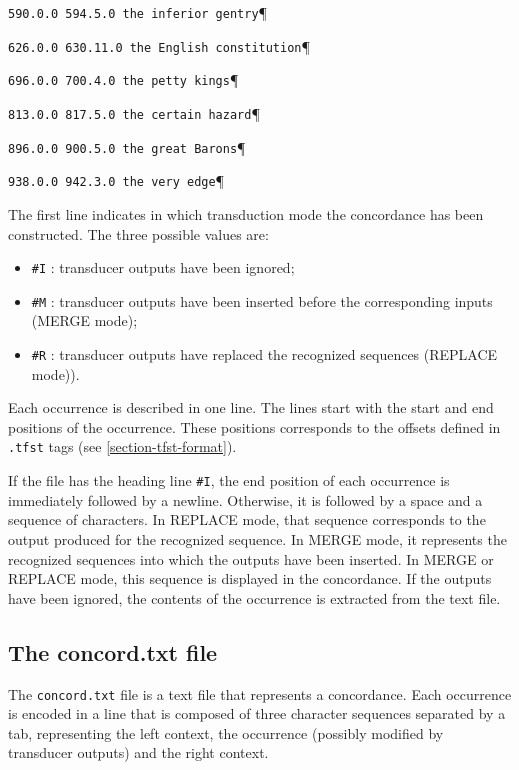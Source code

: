 \verb$590.0.0 594.5.0 the inferior gentry$\P

\verb$626.0.0 630.11.0 the English constitution$\P

\verb$696.0.0 700.4.0 the petty kings$\P

\verb$813.0.0 817.5.0 the certain hazard$\P

\verb$896.0.0 900.5.0 the great Barons$\P

\verb$938.0.0 942.3.0 the very edge$\P

\bigskip
\noindent The first line indicates in which transduction mode the concordance has
been constructed. The three possible values are:

\begin{itemize}
  \item \verb+#I+ : transducer outputs have been ignored;

  \item \verb+#M+ : transducer outputs have been inserted before the
  corresponding inputs (MERGE mode);
  
  \item \verb+#R+ : transducer outputs have replaced the recognized sequences (REPLACE mode)).
\end{itemize}

\bigskip
\noindent Each occurrence is described in one line. The lines start with the start
and end positions of the occurrence. These positions corresponds to the offsets
defined in \verb$.tfst$ tags (see \ref{section-tfst-format}).

\bigskip
\noindent If the file has the heading line \verb+#I+, the end position of each
occurrence is immediately followed by a newline. Otherwise, it is followed by a
space and a sequence of characters. In REPLACE mode, that sequence corresponds to
the output produced for the recognized sequence. In MERGE mode, it represents the
recognized sequences into which the outputs have been inserted. In MERGE or
REPLACE mode, this sequence is displayed in the concordance. If the outputs have
been ignored, the contents of the occurrence is extracted from the text file.


\subsection{The concord.txt file}
The \verb+concord.txt+ file is a text file that represents a concordance. Each
occurrence is encoded in a line that is composed of three character sequences
separated by a tab, representing the left context, the occurrence (possibly
modified by transducer outputs) and the right context.


